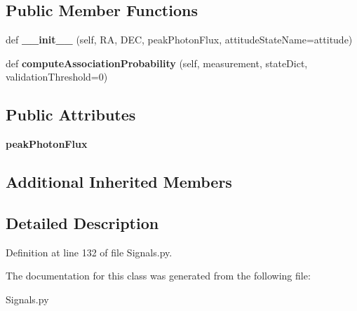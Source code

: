 \subsection*{Public Member Functions}
\begin{DoxyCompactItemize}
\item 
def {\bfseries \+\_\+\+\_\+init\+\_\+\+\_\+} (self, RA, D\+EC, peak\+Photon\+Flux, attitude\+State\+Name=\textquotesingle{}attitude\textquotesingle{})\hypertarget{classSignals_1_1StaticXRayPointSource_ae3efcdb0e8a8c7fe9e3984c1cb785196}{}\label{classSignals_1_1StaticXRayPointSource_ae3efcdb0e8a8c7fe9e3984c1cb785196}

\item 
def {\bfseries compute\+Association\+Probability} (self, measurement, state\+Dict, validation\+Threshold=0)\hypertarget{classSignals_1_1StaticXRayPointSource_a0533a3647597c6ad91c238ab2b97a829}{}\label{classSignals_1_1StaticXRayPointSource_a0533a3647597c6ad91c238ab2b97a829}

\end{DoxyCompactItemize}
\subsection*{Public Attributes}
\begin{DoxyCompactItemize}
\item 
{\bfseries peak\+Photon\+Flux}\hypertarget{classSignals_1_1StaticXRayPointSource_a7e16da6506ee1b83c9858dce9c7856ea}{}\label{classSignals_1_1StaticXRayPointSource_a7e16da6506ee1b83c9858dce9c7856ea}

\end{DoxyCompactItemize}
\subsection*{Additional Inherited Members}


\subsection{Detailed Description}


Definition at line 132 of file Signals.\+py.



The documentation for this class was generated from the following file\+:\begin{DoxyCompactItemize}
\item 
Signals.\+py\end{DoxyCompactItemize}

